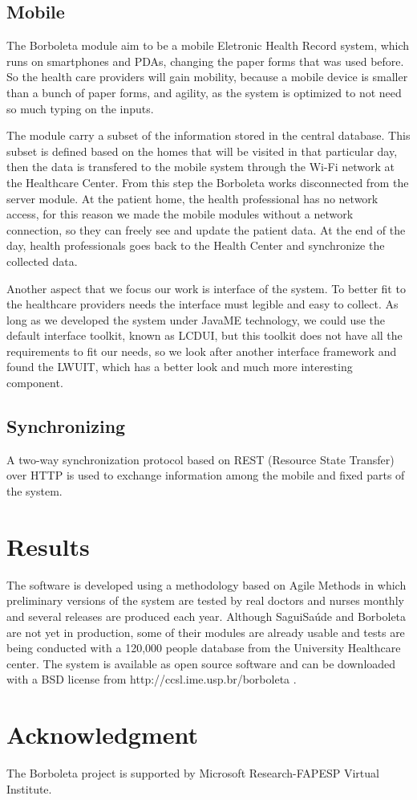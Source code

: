 \documentclass[12pt]{article}
\begin{document}
\subsection{Mobile}
The Borboleta module \cite{correia08} aim to be a mobile Eletronic Health Record system, which runs on smartphones
and PDAs, changing the paper forms that was used before. So the health care providers will gain mobility, because a
mobile device is smaller than a bunch of paper forms, and agility, as the system is optimized to not need so much
typing on the inputs.

The module carry a subset of the information stored in the central database. This subset is defined based on the
homes that will be visited in that particular day, then the data is transfered to the mobile system through the
Wi-Fi network at the Healthcare Center. From this step the Borboleta works disconnected from the server module.
At the patient home, the health professional has no network access, for this reason we made the mobile modules
without a network connection, so they can freely see and update the patient data. At the end of the day, health
professionals goes back to the Health Center and synchronize the collected data.

Another aspect that we focus our work is interface of the system. To better fit to the healthcare providers needs
the interface must legible and easy to collect. As long as we developed the system under JavaME technology,
we could use the default interface toolkit, known as LCDUI, but this toolkit does not have all the requirements
to fit our needs, so we look after another interface framework and found the LWUIT, which has a better look and
much more interesting component.

\subsection{Synchronizing}
A two-way synchronization protocol based on REST (Resource State Transfer) over HTTP is used to exchange information among the mobile and fixed parts of the system.




\section{Results}
The software is developed using a methodology based on Agile Methods in which preliminary versions of the system are tested by real doctors and nurses monthly and several releases are produced each year. Although SaguiSaúde and Borboleta are not yet in production, some of their modules are already usable and tests are being conducted with a 120,000 people database from the University Healthcare center. The system is available as open source software and can be downloaded with a BSD license from http://ccsl.ime.usp.br/borboleta .

\section{Acknowledgment}
The Borboleta project is supported by Microsoft Research-FAPESP Virtual Institute.



\end{document}
